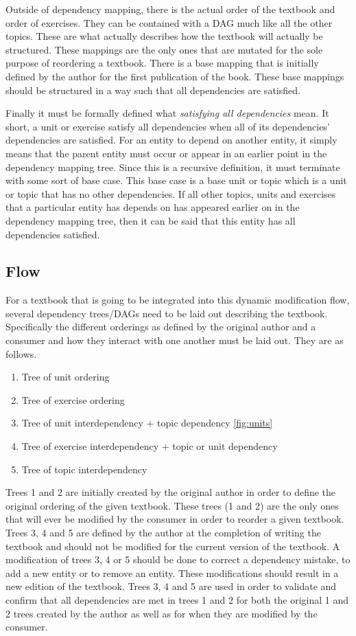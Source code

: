 Outside of dependency mapping, there is the actual order of the textbook and order of exercises. They can be contained with a DAG much like all the other topics. These are what actually describes how the textbook will actually be structured. These mappings are the only ones that are mutated for the sole purpose of reordering a textbook. There is a base mapping that is initially defined by the author for the first publication of the book. These base mappings should be structured in a way such that all dependencies are satisfied.

Finally it must be formally defined what \textit{satisfying all dependencies} mean. It short, a unit or exercise satisfy all dependencies when all of its dependencies' dependencies are satisfied. For an entity to depend on another entity, it simply means that the parent entity must occur or appear in an earlier point in the dependency mapping tree. Since this is a recursive definition, it must terminate with some sort of base case. This base case is a base unit or topic which is a unit or topic that has no other dependencies. If all other topics, units and exercises that a particular entity has depends on has appeared earlier on in the dependency mapping tree, then it can be said that this entity has all dependencies satisfied.

\subsection{Flow}

For a textbook that is going to be integrated into this dynamic modification flow, several dependency trees/DAGs need to be laid out describing the textbook. Specifically the different orderings as defined by the original author and a consumer and how they interact with one another must be laid out. They are as follows.

\begin{enumerate}
    \item Tree of unit ordering
    \item Tree of exercise ordering 
    \item Tree of unit interdependency $+$ topic dependency \ref{fig:units}
    \item Tree of exercise interdependency $+$ topic or unit dependency
    \item Tree of topic interdependency
\end{enumerate}

Trees 1 and 2 are initially created by the original author in order to define the original ordering of the given textbook. These trees (1 and 2) are the only ones that will ever be modified by the consumer in order to reorder a given textbook. Trees 3, 4 and 5 are defined by the author at the completion of writing the textbook and should not be modified for the current version of the textbook. A modification of trees 3, 4 or 5 should be done to correct a dependency mistake, to add a new entity or to remove an entity. These modifications should result in a new edition of the textbook. Trees 3, 4 and 5 are used in order to validate and confirm that all dependencies are met in trees 1 and 2 for both the original 1 and 2 trees created by the author as well as for when they are modified by the consumer.

